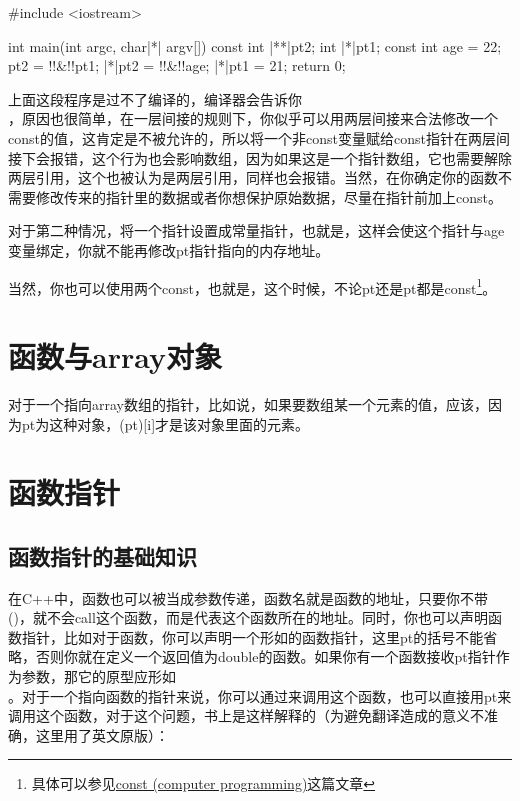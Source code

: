 \begin{cpp}
#include <iostream>

int main(int argc, char|*| argv[]) {
    const int |**|pt2;
    int |*|pt1;
    const int age = 22;
    pt2 = !!&!!pt1;
    |*|pt2 = !!&!!age;
    |*|pt1 = 21;
    return 0;
}
\end{cpp}

上面这段程序是过不了编译的，编译器会告诉你\\ ，原因也很简单，在一层间接的规则下，你似乎可以用两层间接来合法修改一个const的值，这肯定是不被允许的，所以将一个非const变量赋给const指针在两层间接下会报错，这个行为也会影响数组，因为如果这是一个指针数组，它也需要解除两层引用，这个也被认为是两层引用，同样也会报错。当然，在你确定你的函数不需要修改传来的指针里的数据或者你想保护原始数据，尽量在指针前加上const。

对于第二种情况，将一个指针设置成常量指针，也就是，这样会使这个指针与age变量绑定，你就不能再修改pt指针指向的内存地址。

当然，你也可以使用两个const，也就是，这个时候，不论pt还是\thinspace\mbox{\fira{*}}pt都是const\footnote{具体可以参见\thinspace\href{https://en.wikipedia.org/wiki/Const_(computer_programming)}{const (computer programming)}\thinspace 这篇文章}。

\addtocounter{section}{5}

\section{函数与array对象}

对于一个指向array数组的指针，比如说，如果要数组某一个元素的值，应该，因为\thinspace\mbox{\fira{*}}pt为这种对象，(\fira{*}pt)[i]才是该对象里面的元素。

\addtocounter{section}{1}

\section{函数指针}

\subsection{函数指针的基础知识}

在C++中，函数也可以被当成参数传递，函数名就是函数的地址，只要你不带()，就不会call这个函数，而是代表这个函数所在的地址。同时，你也可以声明函数指针，比如对于函数，你可以声明一个形如的函数指针，这里\thinspace\mbox{\fira{*}}pt的括号不能省略，否则你就在定义一个返回值为double\fira{*}的函数。如果你有一个函数接收pt指针作为参数，那它的原型应形如\\ \codeline{));}。对于一个指向函数的指针来说，你可以通过来调用这个函数，也可以直接用pt来调用这个函数，对于这个问题，书上是这样解释的（为避免翻译造成的意义不准确，这里用了英文原版）：

